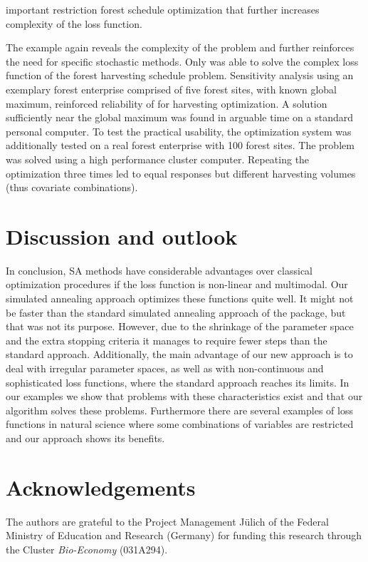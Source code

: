 important restriction forest schedule optimization that further increases complexity of the loss function.

The example again reveals the complexity of the problem and further reinforces the need for specific stochastic methods. Only  was able to solve the complex loss function of the forest harvesting schedule problem. Sensitivity analysis using an exemplary forest enterprise comprised of five forest sites, with known global maximum, reinforced reliability of  for harvesting optimization. A solution sufficiently near the global maximum was found in arguable time on a standard personal computer. To test the practical usability, the optimization system was additionally tested on a real forest enterprise with 100 forest sites. The problem was solved using a high performance cluster computer. Repeating the optimization three times led to equal responses but different harvesting volumes (thus covariate combinations).

\section{Discussion and outlook}
In conclusion, SA methods have considerable advantages over classical optimization procedures if the loss function is non-linear and multimodal. Our simulated annealing approach optimizes these functions quite well. It might not be faster than the standard simulated annealing approach of the  package, but that was not its purpose. However, due to the shrinkage of the parameter space and the extra stopping criteria it manages to require fewer steps than the standard approach. Additionally, the main advantage of our new approach is to deal with irregular parameter spaces, as well as with non-continuous and sophisticated loss functions, where the standard approach reaches its limits. In our examples we show that problems with these characteristics exist and that our algorithm solves these problems. Furthermore there are several examples of loss functions in natural science where some combinations of variables are restricted and our approach shows its benefits.

\section{Acknowledgements}
The authors are grateful to the Project Management Jülich of the Federal Ministry of Education and Research (Germany) for funding this research through the Cluster \textit{Bio-Economy} (031A294).


